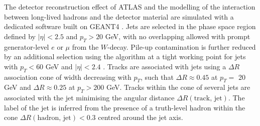 The detector reconstruction effect of ATLAS and the modelling of the interaction between long-lived hadrons and the detector material are simulated with a dedicated software \cite{ATLASSimulationInfra} built on GEANT4 \cite{Agostinelli:602040}. Jets are selected in the phase space region defined by $|\eta| < 2.5$ and $p_T > 20$ GeV, with no overlapping allowed with prompt generator-level $e$ or $\mu$ from the $W$-decay. Pile-up contamination is further reduced by an additional selection using the  algorithm at a tight working point for jets with $p_T < 60$ GeV and $|\eta| < 2.4$ \cite{ATLAS-CONF-2014-018}. Tracks are associated with jets using a $\Delta R$ association cone of width decreasing with $p_T$, such that $\Delta R \approx 0.45$ at $p_T =$ 20 GeV and $\Delta R \approx 0.25$ at $p_T > 200$ GeV. Tracks within the cone of several jets are associated with the jet minimising the angular distance $\Delta R(\textrm{track, jet})$. The label of the jet is inferred from the presence of a truth-level hadron within the cone $\Delta R(\textrm{hadron, jet}) < 0.3$ centred around the jet axis.

